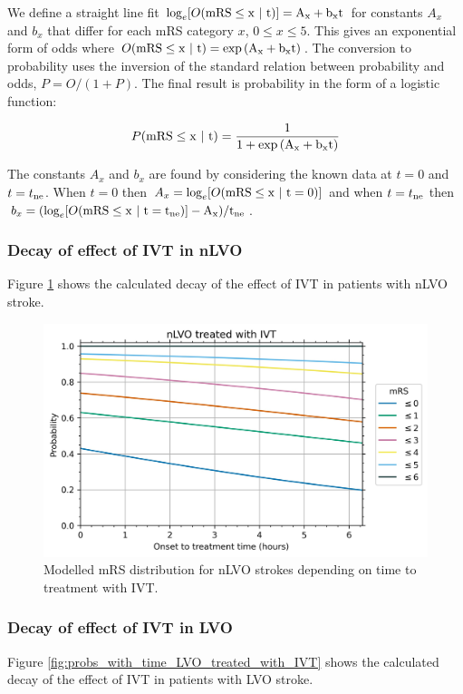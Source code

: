 {{%
We define a straight line fit $\log_e[O(\rm{mRS}\leq x\ |\ t)] = A_x + b_x t$
for constants $A_x$ and $b_x$ that differ for each mRS category $x$, $0\leq x \leq5$.
This gives an exponential form of odds where $O(\rm{mRS}\leq x\ |\ t) = \exp{(A_x + b_x t)}$.
The conversion to probability uses the inversion of the standard relation between probability and odds,  $P=O/(1+P)$. 
The final result is probability in the form of a logistic function:

\begin{equation}
P(\rm{mRS}\leq x\ |\ t) = \frac{1}{1+\exp{(A_x + b_x t)}}
\end{equation}


The constants $A_x$ and $b_x$ are found by considering the known data at $t=0$ and $t=t_\mathrm{ne}$. 
When $t=0$ then $A_x = \log_e[O(\mRS\leq x\ |\ t=0)]$ and when $t=t_\mathrm{ne}$ then $b_x = (\log_e[O(\rm{mRS}\leq x\ |\ t=t_\mathrm{ne})] - A_x) / t_\mathrm{ne}$. 

\subsubsection{Decay of effect of IVT in nLVO}

Figure \ref{fig:probs_with_time_nLVO_treated_with_IVT} shows the calculated decay of the effect of IVT in patients with nLVO stroke.

\begin{figure}[h!]
    \centering
    \includegraphics[width=0.65\linewidth]{images/probs_with_time_nLVO_treated_with_IVT}
    \caption{Modelled mRS distribution for nLVO strokes depending on time to treatment with IVT.}
    \label{fig:probs_with_time_nLVO_treated_with_IVT}
\end{figure}

\subsubsection{Decay of effect of IVT in LVO}

Figure \ref{fig:probs_with_time_LVO_treated_with_IVT} shows the calculated decay of the effect of IVT in patients with LVO stroke.

}}
